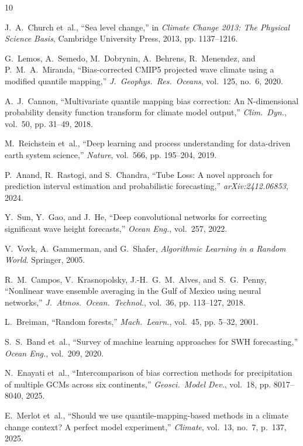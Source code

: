 \documentclass[conference]{IEEEtran}
\begin{document}

\begin{thebibliography}{10}

J.~A.~Church et~al., ``Sea level change,'' in \emph{Climate Change 2013: The Physical Science Basis}, Cambridge University Press, 2013, pp. 1137--1216.

G.~Lemos, A.~Semedo, M.~Dobrynin, A.~Behrens, R.~Menendez, and P.~M.~A.~Miranda, ``Bias-corrected CMIP5 projected wave climate using a modified quantile mapping,'' \emph{J.~Geophys.~Res.~Oceans}, vol.~125, no.~6, 2020.

A.~J.~Cannon, ``Multivariate quantile mapping bias correction: An N-dimensional probability density function transform for climate model output,'' \emph{Clim.~Dyn.}, vol.~50, pp. 31--49, 2018.

M.~Reichstein et~al., ``Deep learning and process understanding for data-driven earth system science,'' \emph{Nature}, vol.~566, pp. 195--204, 2019.

P.~Anand, R.~Rastogi, and S.~Chandra, ``Tube Loss: A novel approach for prediction interval estimation and probabilistic forecasting,'' \emph{arXiv:2412.06853}, 2024.

Y.~Sun, Y.~Gao, and J.~He, ``Deep convolutional networks for correcting significant wave height forecasts,'' \emph{Ocean Eng.}, vol.~257, 2022.

V.~Vovk, A.~Gammerman, and G.~Shafer, \emph{Algorithmic Learning in a Random World}. Springer, 2005.

R.~M.~Campos, V.~Krasnopolsky, J.-H.~G.~M.~Alves, and S.~G.~Penny, ``Nonlinear wave ensemble averaging in the Gulf of Mexico using neural networks,'' \emph{J.~Atmos.~Ocean.~Technol.}, vol.~36, pp. 113--127, 2018.

L.~Breiman, ``Random forests,'' \emph{Mach.~Learn.}, vol.~45, pp. 5--32, 2001.

S.~S.~Band et~al., ``Survey of machine learning approaches for SWH forecasting,'' \emph{Ocean Eng.}, vol.~209, 2020.

N.~Enayati et~al., ``Intercomparison of bias correction methods for precipitation of multiple GCMs across six continents,'' \emph{Geosci.~Model Dev.}, vol.~18, pp. 8017--8040, 2025.

E.~Merlot et~al., ``Should we use quantile-mapping-based methods in a climate change context? A perfect model experiment,'' \emph{Climate}, vol.~13, no.~7, p.~137, 2025.


\end{thebibliography}
\end{document}
